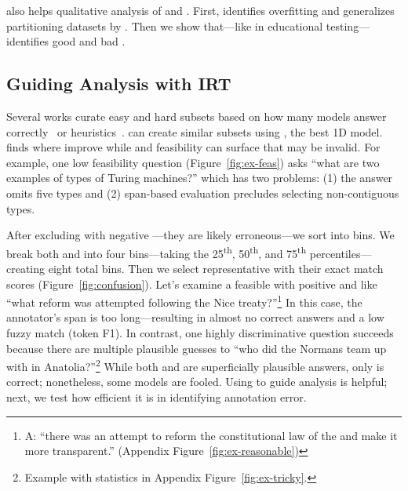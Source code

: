 \name{} also helps qualitative analysis of \itms{} and \subjs{}.
First, \irt{} identifies overfitting and generalizes partitioning datasets by \diff{}.
Then we show that---like in educational testing---\irt{} identifies good and bad \itms{}.

\subsection{Guiding Analysis with IRT}

\begin{figure*}[t]
    \centering
    \caption{
        We partition evaluation data by \irt{} \diff{} and
        \discability{} with accuracy in each quartile.
        Most improvements in high-accuracy systems come from getting
        high-difficulty questions right.
        \Itms{} with low \discability{} (and thus prone to annotation errors) are difficult for all \subjs{} except the overfit  model.
        We include top-performing \squad{} \subjs{}, several notable
        \subjs{} (systems), and a pair from the bottom of the leaderboard.
    }
    \label{fig:confusion}
\end{figure*}

Several works curate easy and hard  subsets based on how many
models answer correctly~\citep{Rondeau2018-um} or
heuristics~\citep{sugawara2018easier}.
\irt{} can create similar subsets using , the best 1D model.
\Diff{} finds where \subjs{} improve while \discability{} and
feasibility can surface \itms{} that may be invalid.
For example, one low feasibility question (Figure~\ref{fig:ex-feas}) asks
``what are two examples of types of Turing machines?'' which has two
problems: (1) the answer omits five types and (2) span-based
evaluation precludes selecting non-contiguous types.

After excluding \itms{} with negative \discability{}---they are
likely erroneous---we sort \itms{} into bins.
We break both \diff{} and \discability{} into four bins---taking the 25\textsuperscript{th},
50\textsuperscript{th}, and 75\textsuperscript{th}
percentiles---creating eight total bins.
Then we select representative \squad{} \subjs{} with their
exact match scores (Figure~\ref{fig:confusion}).
Let's examine a feasible \itm{} with positive \diff{} and \discability{} like ``what reform was attempted following the Nice treaty?''\footnote{
    A: ``there was an attempt to reform the constitutional law of the  and make it more transparent.'' (Appendix Figure~\ref{fig:ex-reasonable})
}
In this case, the annotator's span is too long---resulting in almost
no correct answers and a low fuzzy match (token F1).
In contrast, one highly discriminative question succeeds because there
are multiple plausible guesses to ``who did the Normans team up with
in Anatolia?''\footnote{ Example with statistics in Appendix
    Figure~\ref{fig:ex-tricky}.
}
While both  and  are
superficially plausible answers, only  is correct;
nonetheless, some models are fooled.
Using \irt{} to guide \subj{} analysis is helpful; next, we test how
efficient it is in identifying annotation error.

